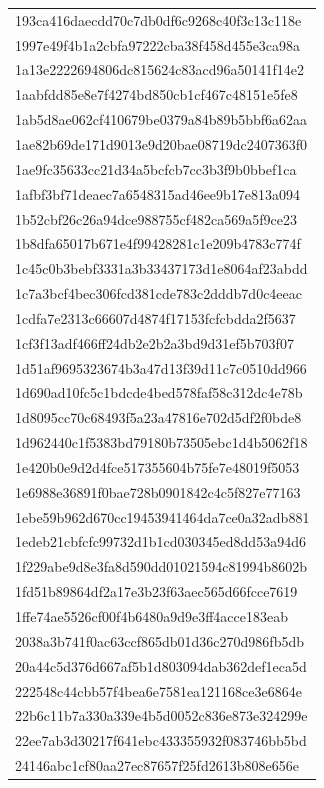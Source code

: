 \begin{tabular}{l}
193ca416daecdd70c7db0df6c9268c40f3c13c118e \\
1997e49f4b1a2cbfa97222cba38f458d455e3ca98a \\
1a13e2222694806dc815624c83acd96a50141f14e2 \\
1aabfdd85e8e7f4274bd850cb1cf467c48151e5fe8 \\
1ab5d8ae062cf410679be0379a84b89b5bbf6a62aa \\
1ae82b69de171d9013e9d20bae08719dc2407363f0 \\
1ae9fc35633cc21d34a5bcfcb7cc3b3f9b0bbef1ca \\
1afbf3bf71deaec7a6548315ad46ee9b17e813a094 \\
1b52cbf26c26a94dce988755cf482ca569a5f9ce23 \\
1b8dfa65017b671e4f99428281c1e209b4783c774f \\
1c45c0b3bebf3331a3b33437173d1e8064af23abdd \\
1c7a3bcf4bec306fcd381cde783c2dddb7d0c4eeac \\
1cdfa7e2313c66607d4874f17153fcfcbdda2f5637 \\
1cf3f13adf466ff24db2e2b2a3bd9d31ef5b703f07 \\
1d51af9695323674b3a47d13f39d11c7c0510dd966 \\
1d690ad10fc5c1bdcde4bed578faf58c312dc4e78b \\
1d8095cc70c68493f5a23a47816e702d5df2f0bde8 \\
1d962440c1f5383bd79180b73505ebc1d4b5062f18 \\
1e420b0e9d2d4fce517355604b75fe7e48019f5053 \\
1e6988e36891f0bae728b0901842c4c5f827e77163 \\
1ebe59b962d670cc19453941464da7ce0a32adb881 \\
1edeb21cbfcfc99732d1b1cd030345ed8dd53a94d6 \\
1f229abe9d8e3fa8d590dd01021594c81994b8602b \\
1fd51b89864df2a17e3b23f63aec565d66fcce7619 \\
1ffe74ae5526cf00f4b6480a9d9e3ff4acce183eab \\
2038a3b741f0ac63ccf865db01d36c270d986fb5db \\
20a44c5d376d667af5b1d803094dab362def1eca5d \\
222548c44cbb57f4bea6e7581ea121168ce3e6864e \\
22b6c11b7a330a339e4b5d0052c836e873e324299e \\
22ee7ab3d30217f641ebc433355932f083746bb5bd \\
24146abc1cf80aa27ec87657f25fd2613b808e656e \\

\end{tabular}
